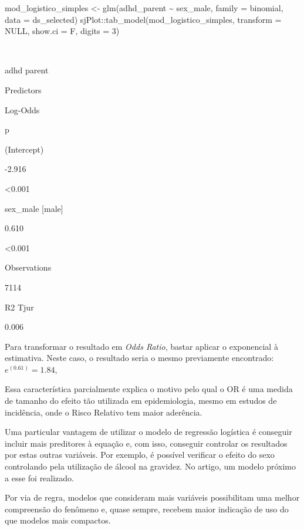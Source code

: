 \documentclass[
]{book}
\newenvironment{Shaded}{\begin{snugshade}}{\end{snugshade}}
\newcommand{\AttributeTok}[1]{\textcolor[rgb]{0.77,0.63,0.00}{#1}}
\newcommand{\ConstantTok}[1]{\textcolor[rgb]{0.00,0.00,0.00}{#1}}
\newcommand{\DecValTok}[1]{\textcolor[rgb]{0.00,0.00,0.81}{#1}}
\newcommand{\FunctionTok}[1]{\textcolor[rgb]{0.00,0.00,0.00}{#1}}
\newcommand{\NormalTok}[1]{#1}
\newcommand{\OtherTok}[1]{\textcolor[rgb]{0.56,0.35,0.01}{#1}}
\newcommand{\SpecialCharTok}[1]{\textcolor[rgb]{0.00,0.00,0.00}{#1}}
\begin{document}
\begin{Shaded}
\begin{Highlighting}[]
\NormalTok{mod\_logistico\_simples }\OtherTok{\textless{}{-}} \FunctionTok{glm}\NormalTok{(adhd\_parent }\SpecialCharTok{\textasciitilde{}}\NormalTok{ sex\_male,}
                             \AttributeTok{family =}\NormalTok{ binomial, }
                             \AttributeTok{data =}\NormalTok{ ds\_selected)}
\NormalTok{sjPlot}\SpecialCharTok{::}\FunctionTok{tab\_model}\NormalTok{(mod\_logistico\_simples,}
                  \AttributeTok{transform =} \ConstantTok{NULL}\NormalTok{, }
                  \AttributeTok{show.ci =}\NormalTok{ F, }
                  \AttributeTok{digits =} \DecValTok{3}\NormalTok{)}
\end{Highlighting}
\end{Shaded}

~

adhd parent

Predictors

Log-Odds

p

(Intercept)

-2.916

\textless0.001

sex\_male {[}male{]}

0.610

\textless0.001

Observations

7114

R2 Tjur

0.006

Para transformar o resultado em \emph{Odds Ratio}, bastar aplicar o exponencial à estimativa. Neste caso, o resultado seria o mesmo previamente encontrado: \(e^{(0.61)} = 1.84\),

Essa característica parcialmente explica o motivo pelo qual o OR é uma medida de tamanho do efeito tão utilizada em epidemiologia, mesmo em estudos de incidência, onde o Risco Relativo tem maior aderência.

Uma particular vantagem de utilizar o modelo de regressão logística é conseguir incluir mais preditores à equação e, com isso, conseguir controlar os resultados por estas outras variáveis. Por exemplo, é possível verificar o efeito do sexo controlando pela utilização de álcool na gravidez. No artigo, um modelo próximo a esse foi realizado.

Por via de regra, modelos que consideram mais variáveis possibilitam uma melhor compreensão do fenômeno e, quase sempre, recebem maior indicação de uso do que modelos mais compactos.
\end{document}
